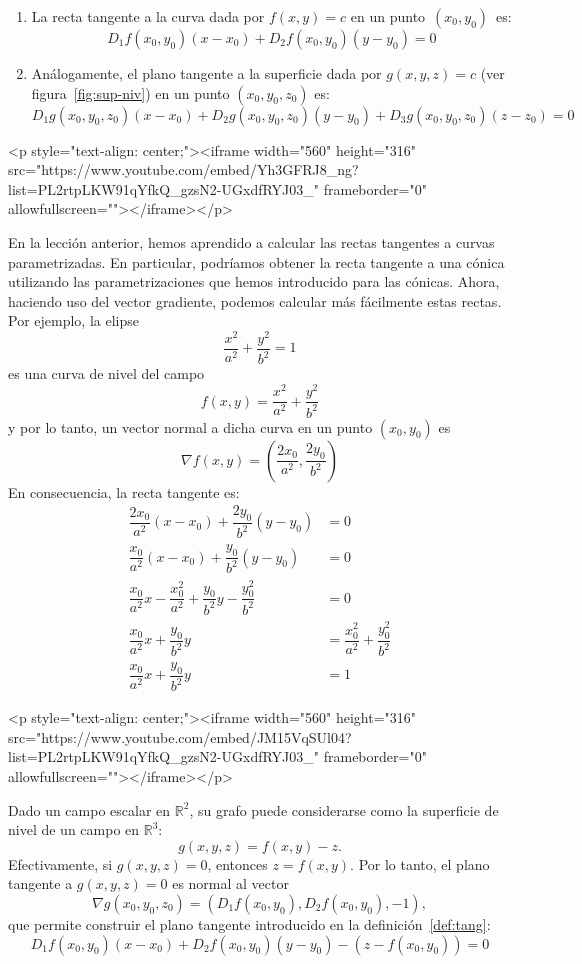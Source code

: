%
\begin{enumerate}
\item
La recta tangente a la curva dada por $f(x,y)=c$ en un punto~$(x_0,y_0)$~es:
\[
D_1f(x_0,y_0)(x-x_0)+D_2f(x_0,y_0)(y-y_0)=0
\]
\item
Análogamente, el plano tangente a la superficie dada por $g(x,y,z)=c$ (ver figura~\ref{fig:sup-niv}) en un punto $(x_0,y_0,z_0)$ es:
\[
D_1g(x_0,y_0,z_0)(x-x_0)+D_2g(x_0,y_0,z_0)(y-y_0)+D_3g(x_0,y_0,z_0)(z-z_0)=0
\]
\end{enumerate}

\begin{rawhtml}
<p style="text-align: center;"><iframe width="560" height="316" src="https://www.youtube.com/embed/Yh3GFRJ8_ng?list=PL2rtpLKW91qYfkQ_gzsN2-UGxdfRYJ03_" frameborder="0" allowfullscreen=""></iframe></p>
\end{rawhtml}

\begin{ejemplo}
En la lección anterior, hemos aprendido a calcular las rectas tangentes a curvas parametrizadas.
En particular, podríamos obtener la recta tangente a una cónica utilizando las parametrizaciones que hemos introducido para las cónicas.
Ahora, haciendo uso del vector gradiente, podemos calcular más fácilmente estas rectas.
Por ejemplo, la elipse
\[
\dfrac{x^2}{a^2}+\dfrac{y^2}{b^2}=1
\]
es una curva de nivel del campo
\[
f(x,y)=\dfrac{x^2}{a^2}+\dfrac{y^2}{b^2}
\]
y por lo tanto, un vector normal a dicha curva en un punto $(x_0,y_0)$ es
\[
\nabla f(x,y)=\left(\dfrac{2x_0}{a^2},\dfrac{2y_0}{b^2}\right)
\]
En consecuencia, la recta tangente es:
\begin{align*}
\dfrac{2x_0}{a^2}(x-x_0)+\dfrac{2y_0}{b^2}(y-y_0)&=0\\
\dfrac{x_0}{a^2}(x-x_0)+\dfrac{y_0}{b^2}(y-y_0)&=0\\
\dfrac{x_0}{a^2}x-\dfrac{x_0^2}{a^2}+\dfrac{y_0}{b^2}y-\dfrac{y_0^2}{b^2}&=0\\
\dfrac{x_0}{a^2}x+\dfrac{y_0}{b^2}y&=\dfrac{x_0^2}{a^2}+\dfrac{y_0^2}{b^2}\\
\dfrac{x_0}{a^2}x+\dfrac{y_0}{b^2}y&=1\tag*{\fej}
\end{align*}
\begin{rawhtml}
<p style="text-align: center;"><iframe width="560" height="316" src="https://www.youtube.com/embed/JM15VqSUl04?list=PL2rtpLKW91qYfkQ_gzsN2-UGxdfRYJ03_" frameborder="0" allowfullscreen=""></iframe></p>
\end{rawhtml}
\end{ejemplo}
%
\begin{ejemplo}
Dado un campo escalar en $\mathbb{R}^2$, su grafo puede considerarse como la superficie de nivel de un campo en $\mathbb{R}^3$:
\[
g(x,y,z)=f(x,y)-z.
\]
Efectivamente, si $g(x,y,z)=0$, entonces $z=f(x,y)$.
Por lo tanto, el plano tangente a $g(x,y,z)=0$ es normal al vector
\[
\nabla g(x_0,y_0,z_0)=(D_1f(x_0,y_0),D_2f(x_0,y_0),-1),
\]
que permite construir el plano tangente introducido en la definición~\ref{def:tang}:
\[
D_1f(x_0,y_0)(x-x_0)+D_2f(x_0,y_0)(y-y_0)-(z-f(x_0,y_0))=0\tag*{\fej}
\]
\end{ejemplo}


